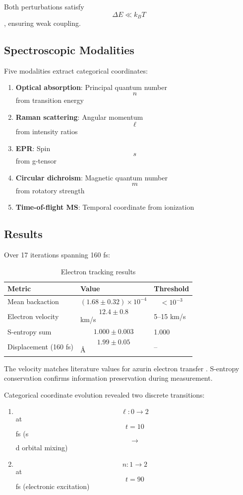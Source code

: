 \documentclass[twocolumn,10pt]{article}
\begin{document}
Both perturbations satisfy $$\Delta E \ll k_B T$$, ensuring weak coupling.

\subsection{Spectroscopic Modalities}

Five modalities extract categorical coordinates:
\begin{enumerate}
\item \textbf{Optical absorption}: Principal quantum number $$n$$ from transition energy
\item \textbf{Raman scattering}: Angular momentum $$\ell$$ from intensity ratios
\item \textbf{EPR}: Spin $$s$$ from g-tensor
\item \textbf{Circular dichroism}: Magnetic quantum number $$m$$ from rotatory strength
\item \textbf{Time-of-flight MS}: Temporal coordinate from ionization
\end{enumerate}

\subsection{Results}

Over 17 iterations spanning 160 fs:

\begin{table}[H]
\centering
\caption{Electron tracking results}
\begin{tabular}{@{}lll@{}}
\toprule
Metric & Value & Threshold \\
\midrule
Mean backaction & $$(1.68 \pm 0.32) \times 10^{-4}$$ & $$< 10^{-3}$$ \\
Electron velocity & $$12.4 \pm 0.8$$ km/s & 5--15 km/s \\
S-entropy sum & $$1.000 \pm 0.003$$ & 1.000 \\
Displacement (160 fs) & $$1.99 \pm 0.05$$ \AA & -- \\
\bottomrule
\end{tabular}
\end{table}

The velocity matches literature values for azurin electron transfer \cite{Gray2003}. S-entropy conservation confirms information preservation during measurement.

Categorical coordinate evolution revealed two discrete transitions:
\begin{enumerate}
\item $$\ell: 0 \to 2$$ at $$t = 10$$ fs (s $$\to$$ d orbital mixing)
\item $$n: 1 \to 2$$ at $$t = 90$$ fs (electronic excitation)
\end{enumerate}
\end{document}
